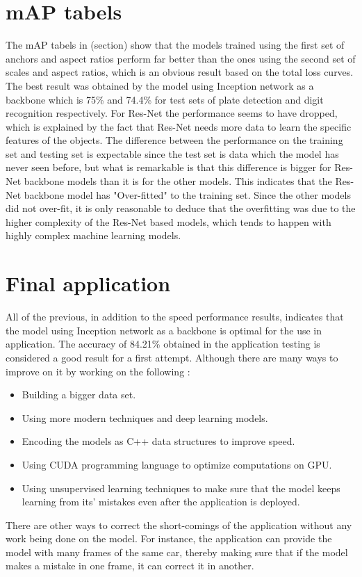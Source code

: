 \section{mAP tabels}
The mAP tabels in (section) show that the models trained using the first set of anchors and aspect ratios perform far better than the ones using the second set of scales and aspect ratios, which is an obvious result based on the total loss curves. The best result was obtained by the model using Inception network as a backbone which is 75\% and 74.4\% for test sets of plate detection and digit recognition respectively. For Res-Net the performance seems to have dropped, which is explained by the fact that Res-Net needs more data to learn the specific features of the objects. The difference between the performance on the training set and testing set is expectable since the test set is data which the model has never seen before, but what is remarkable is that this difference is bigger for Res-Net backbone models than it is for the other models. This indicates that the Res-Net backbone model has "Over-fitted" to the training set. Since the other models did not over-fit, it is only reasonable to deduce that the overfitting was due to the higher complexity of the Res-Net based models, which tends to happen with highly complex machine learning models.


\section{Final application}
All of the previous, in addition to the speed performance results, indicates that the model using Inception network as a backbone is optimal for the use in application.
The accuracy of 84.21\% obtained in the application testing is considered a good result for a first attempt. Although there are many ways to improve on it by working on the following :
\begin{itemize}
	\item Building a bigger data set.
	\item Using more modern techniques and deep learning models.
	\item Encoding the models as C++ data structures to improve speed.
	\item Using CUDA programming language to optimize computations on GPU.
	\item Using unsupervised learning techniques to make sure that the model keeps learning from its' mistakes even after the application is deployed.
\end{itemize}

There are other ways to correct the short-comings of the application without any work being done on the model. For instance, the application can provide the model with many frames of the same car, thereby making sure that if the model makes a mistake in one frame, it can correct it in another.

